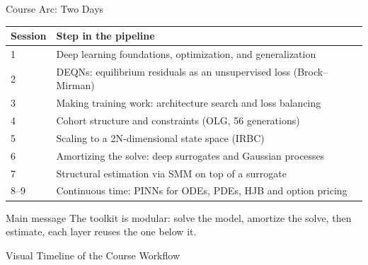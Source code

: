 \documentclass[aspectratio=169,11pt]{beamer}
\begin{document}
\begin{frame}{Course Arc: Two Days}
\small
\begin{center}
\begin{tabular}{ll}
\toprule
\textbf{Session} & \textbf{Step in the pipeline} \\
\midrule
1 & Deep learning foundations, optimization, and generalization \\
2 & DEQNs: equilibrium residuals as an unsupervised loss (Brock--Mirman) \\
3 & Making training work: architecture search and loss balancing \\
4 & Cohort structure and constraints (OLG, 56 generations) \\
5 & Scaling to a 2N-dimensional state space (IRBC) \\
6 & Amortizing the solve: deep surrogates and Gaussian processes \\
7 & Structural estimation via SMM on top of a surrogate \\
8--9 & Continuous time: PINNs for ODEs, PDEs, HJB and option pricing \\
\bottomrule
\end{tabular}
\end{center}

\vspace{0.2cm}
\begin{alertblock}{Main message}
The toolkit is modular: solve the model, amortize the solve, then estimate,
each layer reuses the one below it.
\end{alertblock}
\end{frame}

\begin{frame}{Visual Timeline of the Course Workflow}
\begin{center}
\end{center}
\end{frame}
\end{document}
